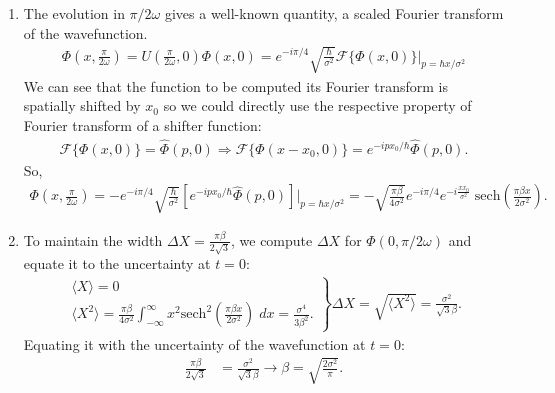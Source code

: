 \documentclass[letterpaper,11pt,twoside]{article}
\newcommand{\braket}[1]{\langle#1\rangle}
\begin{document}
\begin{enumerate}[itemsep=0pt,topsep=0pt,label=\alph*)]
  \item The evolution in $\pi/2\omega$ gives a well-known quantity, a scaled Fourier transform of the wavefunction.
  \begin{align*}
    \Phi(x,\frac{\pi}{2\omega})=U(\frac{\pi}{2\omega},0)\Phi(x,0)=e^{-i\pi/4}\sqrt{\frac{\hbar}{\sigma^2}}\mathcal{F}\{\Phi(x,0)\}\bigr|_{p=\hbar x/\sigma^2}
  \end{align*}
  We can see that the function to be computed its Fourier transform is spatially shifted by $x_0$ so we could directly use the respective property of Fourier transform of a shifter function:
  \begin{align*}
    \mathcal{F}\{\Phi(x,0)\}=\hat{\Phi}(p,0)\Longrightarrow \mathcal{F}\{\Phi(x-x_0,0)\}=e^{-ipx_0/\hbar}\hat{\Phi}(p,0).
  \end{align*}
  So,
  \begin{align*}
    \Phi(x,\frac{\pi}{2\omega})=-e^{-i\pi/4}\sqrt{\frac{\hbar}{\sigma^2}}\left[e^{-ipx_0/\hbar}\hat{\Phi}(p,0)\right]\biggr|_{p=\hbar x/\sigma^2}=-\sqrt{\frac{\pi\beta}{4\sigma^2}}e^{-i\pi/4}e^{-i\frac{xx_0}{\sigma^2}}\;\text{sech}(\frac{\pi\beta x}{2\sigma^2}).
  \end{align*}
  \item To maintain the width $\Delta X=\frac{\pi\beta}{2\sqrt{3}}$, we compute $\Delta X$ for $\Phi(0,\pi/2\omega)$ and equate it to the uncertainty at $t=0$:
  \begin{align*}
    \left.
    \begin{array}{l}
      \braket{X}=0\\
      \displaystyle\braket{X^2}=\frac{\pi\beta}{4\sigma^2}\int_{-\infty}^\infty x^2\text{sech}^2(\frac{\pi\beta x}{2\sigma^2})\;dx=\frac{\sigma^4}{3\beta^2}.
    \end{array}\right\}\Delta X=\sqrt{\braket{X^2}}=\frac{\sigma^2}{\sqrt{3}\beta}.
  \end{align*} 
  Equating it with the uncertainty of the wavefunction at $t=0$:
  \begin{align*}
    \frac{\pi\beta}{2\sqrt{3}}&=\frac{\sigma^2}{\sqrt{3}\beta}\longrightarrow\beta=\sqrt{\frac{2\sigma^2}{\pi}}.
  \end{align*}
\end{enumerate}

\end{document}

